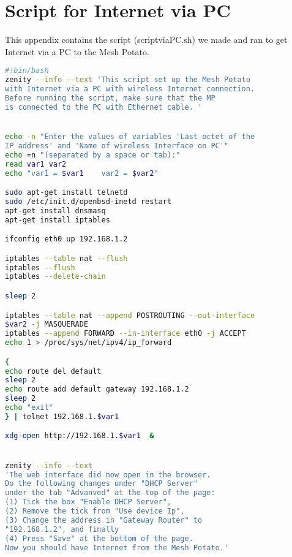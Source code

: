 \chapter{Script for Internet via PC}
\label{chp:appendixD} 

This appendix contains the script (scriptviaPC.sh) we made and ran to get Internet via a PC to the Mesh Potato.  

\begin{framed}
\noindent
\lstset{showstringspaces=false}
\begin{lstlisting}[language=sh]
#!bin/bash
zenity --info --text 'This script set up the Mesh Potato
with Internet via a PC with wireless Internet connection. 
Before running the script, make sure that the MP 
is connected to the PC with Ethernet cable. '


echo -n "Enter the values of variables 'Last octet of the
IP address' and 'Name of wireless Interface on PC'"
echo =n "(separated by a space or tab):"
read var1 var2
echo "var1 = $var1    var2 = $var2"

sudo apt-get install telnetd
sudo /etc/init.d/openbsd-inetd restart
apt-get install dnsmasq
apt-get install iptables 

ifconfig eth0 up 192.168.1.2

iptables --table nat --flush
iptables --flush
iptables --delete-chain

sleep 2

iptables --table nat --append POSTROUTING --out-interface 
$var2 -j MASQUERADE
iptables --append FORWARD --in-interface eth0 -j ACCEPT
echo 1 > /proc/sys/net/ipv4/ip_forward

{
echo route del default
sleep 2
echo route add default gateway 192.168.1.2
sleep 2
echo "exit"
} | telnet 192.168.1.$var1

xdg-open http://192.168.1.$var1  &


zenity --info --text 
'The web interface did now open in the browser. 
Do the following changes under "DHCP Server" 
under the tab "Advanved" at the top of the page:
(1) Tick the box "Enable DHCP Server",
(2) Remove the tick from "Use device Ip", 
(3) Change the address in "Gateway Router" to 
"192.168.1.2", and finally 
(4) Press "Save" at the bottom of the page. 
Now you should have Internet from the Mesh Potato.'

\end{lstlisting}
\end{framed}

